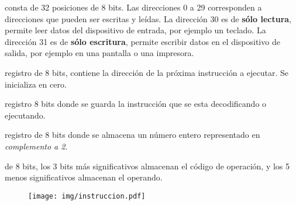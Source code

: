 \documentclass[12pt]{article}
\begin{document}
\begin{description}
    \itemsep2pt \parskip0pt 

    \item[Memoria:] consta de 32 posiciones de 8 bits. Las direcciones 0 a 29
        corresponden a direcciones que pueden ser escritas y leídas. La
        dirección 30 es de \textbf{sólo lectura}, permite leer datos del
        dispositivo de entrada, por ejemplo un teclado. La dirección 31 es de
        \textbf{sólo escritura}, permite escribir datos en el dispositivo de
        salida, por ejemplo en una pantalla o una impresora.

    \item[Registro PC:] registro de 8 bits, contiene la dirección de la
        próxima instrucción a ejecutar. Se inicializa en cero.

    \item[Registro IR:] registro 8 bits donde se guarda la instrucción que se
        esta decodificando o ejecutando.

    \item[Registro acumulador:] registro de 8 bits donde se almacena un
        número entero representado en \emph{complemento a 2}.

    \item[Instrucciones:] de 8 bits, los 3 bits más significativos almacenan
        el código de operación, y los 5 menos significativos almacenan el
        operando.

        \begin{figure}[h]
            \centering
            \texttt{[image: img/instruccion.pdf]}
        \end{figure}

\end{description}
\end{document}
